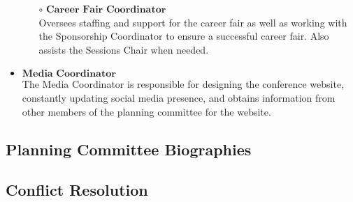 \begin{itemize}
\begin{itemize}
		\item[$\circ$] $\textbf{Career Fair Coordinator}$\\
		Oversees staffing and support for the career fair as well as working with the Sponsorship
		Coordinator to ensure a successful career fair. Also assists the Sessions Chair when needed.
	\end{itemize}
	\item $\textbf{Media Coordinator}$\\
		The Media Coordinator is responsible for designing the conference website, constantly updating social media presence,
		and obtains information from other members of the planning committee for the website.
\end{itemize}

\newpage
\subsection{Planning Committee Biographies}


\subsection{Conflict Resolution}

